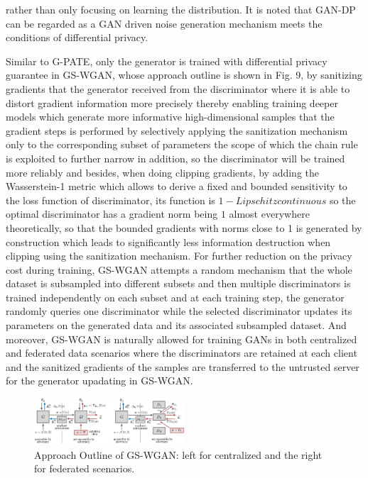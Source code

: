 \documentclass[conference]{IEEEtran}
\begin{document}
rather than only focusing on learning the distribution. It is noted that GAN-DP can be regarded as a GAN driven noise generation mechanism meets the conditions of differential privacy.

Similar to G-PATE, only the generator is trained with differential privacy guarantee in GS-WGAN\cite{b41}, whose approach outline is shown in Fig. 9, by sanitizing gradients that the generator received from the discriminator where it is able to distort gradient information more precisely thereby enabling training deeper models which generate more informative high-dimensional samples that the gradient steps is performed by selectively applying the sanitization mechanism only to the corresponding subset of parameters the scope of which the chain rule is exploited to further narrow in addition, so the  discriminator will be trained more reliably and besides, when doing clipping gradients, by adding the Wasserstein-1 metric which allows to derive a fixed and bounded sensitivity to the loss function of discriminator, its function is $1-Lipschitz continuous$ so the optimal discriminator has a gradient norm being $1$ almost everywhere theoretically, so that the bounded gradients with norms close to 1 is generated by construction which leads to significantly less information destruction when clipping using the sanitization mechanism. For further reduction on the privacy cost during training, GS-WGAN attempts a random mechanism that the whole dataset is subsampled into different subsets and then multiple discriminators is trained independently on each subset and at each training step, the generator randomly queries one discriminator while the selected discriminator updates its parameters on the generated data and its associated subsampled dataset. And moreover, GS-WGAN is naturally allowed for training GANs in both centralized and federated data scenarios where the discriminators are retained at each client and the  sanitized gradients of the samples are transferred to the untrusted server for the generator upadating in GS-WGAN.
\begin{figure}[htbp]
    \centerline{\includegraphics[width=0.5\textwidth,height=0.15\textwidth]{GS-WGAN.png}}
    \caption{Approach Outline of GS-WGAN: left for centralized and the right for federated scenarios.}
    \label{fig9}
\end{figure}\\
\end{document}
